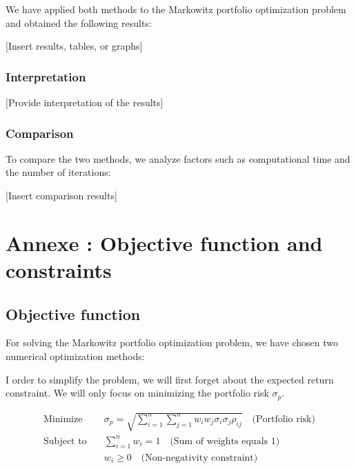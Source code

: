 \documentclass[12pt]{article}
\begin{document}
We have applied both methods to the Markowitz portfolio optimization problem and obtained the following results:

[Insert results, tables, or graphs]

\subsubsection*{Interpretation}

[Provide interpretation of the results]

\subsubsection*{Comparison}

To compare the two methods, we analyze factors such as computational time and the number of iterations:

[Insert comparison results]

\section*{Annexe : Objective function and constraints}

\subsection*{Objective function}

For solving the Markowitz portfolio optimization problem, we have chosen two numerical optimization methods:


I order to simplify the problem, we will first forget about the expected return constraint. We will only focus on minimizing the portfolio risk $\sigma_p$.

\begin{equation}
    \begin{aligned}
        \text{Minimize} \quad   & \sigma_p = \sqrt{\sum_{i=1}^{n}\sum_{j=1}^{n} w_i w_j \sigma_i \sigma_j \rho_{ij}} \quad \text{(Portfolio risk)} \\
        \text{Subject to} \quad & \sum_{i=1}^{n} w_i = 1 \quad \text{(Sum of weights equals 1)}                                                        \\
                                & w_i \geq 0 \quad \text{(Non-negativity constraint)}
    \end{aligned}
\end{equation}
\end{document}

